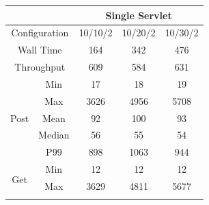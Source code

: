 \documentclass[a4paper,12pt]{article} %
\begin{document}
\begin{enumerate}
\begin{table}[H]
    \centering
    \begin{tabular}{ccccc}
    \hline
    \multicolumn{2}{|c|}{}                                                      & \multicolumn{3}{c|}{Single Servlet}                                                         \\ \hline
    \multicolumn{2}{|c|}{Configuration}                                       & \multicolumn{1}{c|}{10/10/2} & \multicolumn{1}{c|}{10/20/2} & \multicolumn{1}{c|}{10/30/2} \\ \hline
    \multicolumn{2}{|c|}{Wall Time}                                           & \multicolumn{1}{c|}{164}     & \multicolumn{1}{c|}{342}     & \multicolumn{1}{c|}{476}     \\ \hline
    \multicolumn{2}{|c|}{Throughput}                                          & \multicolumn{1}{c|}{609}     & \multicolumn{1}{c|}{584}     & \multicolumn{1}{c|}{631}     \\ \hline
    \multicolumn{1}{|c|}{\multirow{5}{*}{Post}} & \multicolumn{1}{c|}{Min}    & \multicolumn{1}{c|}{17}      & \multicolumn{1}{c|}{18}      & \multicolumn{1}{c|}{19}      \\ \cline{2-5} 
    \multicolumn{1}{|c|}{}                      & \multicolumn{1}{c|}{Max}    & \multicolumn{1}{c|}{3626}    & \multicolumn{1}{c|}{4956}    & \multicolumn{1}{c|}{5708}    \\ \cline{2-5} 
    \multicolumn{1}{|c|}{}                      & \multicolumn{1}{c|}{Mean}   & \multicolumn{1}{c|}{92}      & \multicolumn{1}{c|}{100}     & \multicolumn{1}{c|}{93}      \\ \cline{2-5} 
    \multicolumn{1}{|c|}{}                      & \multicolumn{1}{c|}{Median} & \multicolumn{1}{c|}{56}      & \multicolumn{1}{c|}{55}      & \multicolumn{1}{c|}{54}      \\ \cline{2-5} 
    \multicolumn{1}{|c|}{}                      & \multicolumn{1}{c|}{P99}    & \multicolumn{1}{c|}{898}     & \multicolumn{1}{c|}{1063}    & \multicolumn{1}{c|}{944}     \\ \hline
    \multicolumn{1}{|c|}{\multirow{5}{*}{Get}}  & \multicolumn{1}{c|}{Min}    & \multicolumn{1}{c|}{12}      & \multicolumn{1}{c|}{12}      & \multicolumn{1}{c|}{12}      \\ \cline{2-5} 
    \multicolumn{1}{|c|}{}                      & \multicolumn{1}{c|}{Max}    & \multicolumn{1}{c|}{3629}    & \multicolumn{1}{c|}{4811}    & \multicolumn{1}{c|}{5677}    \\ \cline{2-5} 

\end{tabular}
\end{table}
\end{enumerate}
\end{document}
